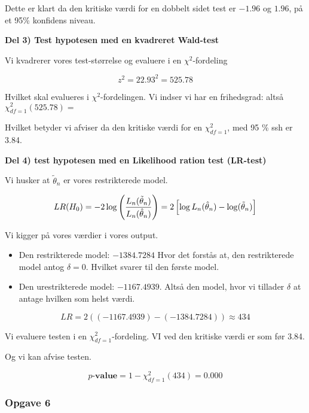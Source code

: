 Dette er klart da den kritiske værdi for en dobbelt sidet test er $- 1.96$ og $1.96$, på et 95\% konfidens niveau.

\textbf{Del 3) Test hypotesen med en kvadreret Wald-test}

Vi kvadrerer vores test-størrelse og evaluere i en $\chi^2$-fordeling

\begin{equation}
    z^2 = 22.93^2 = 525.78
\end{equation}

Hvilket skal evalueres i $\chi^2$-fordelingen. Vi indser vi har en frihedsgrad: altså $\chi^2_{df=1}(525.78)= $

Hvilket betyder vi afviser da den kritiske værdi for en $\chi^2_{df=1}$, med 95 \% ssh er 3.84.

\textbf{Del 4) test hypotesen med en Likelihood ration test (LR-test)}

Vi husker at $\tilde{\theta}_n$ er vores restrikterede model.

\begin{equation}
    LR(H_0) = - 2\log \left( \frac{L_n (\tilde{\theta}_n)}{L_n (\hat{\theta}_n)}\right) = 2 \left[ \log L_n (\hat{\theta}_n) - \log(\tilde{\theta}_n)\right]
\end{equation}

Vi kigger på vores værdier i vores output.

\begin{itemize}
    \item Den restrikterede model: $-1384.7284$
    Hvor det forstås at, den restrikterede model antog $\delta= 0$. Hvilket svarer til den første model.
    \item Den urestrikterede model: $-1167.4939$. Altså den model, hvor vi tillader $\delta$ at antage hvilken som helst værdi.
\end{itemize}

\begin{equation}
    LR = 2( (- 1167.4939) - (- 1384.7284 )) \approx 434
\end{equation}

Vi evaluere testen i en $\chi^2_{df=1}$-fordeling. VI ved den kritiske værdi er som før 3.84.

Og vi kan afvise testen.

\begin{equation}
    p\textbf{-value} = 1 - \chi^2_{df=1}(434) = 0.000
\end{equation}

\subsubsection{Opgave 6}

